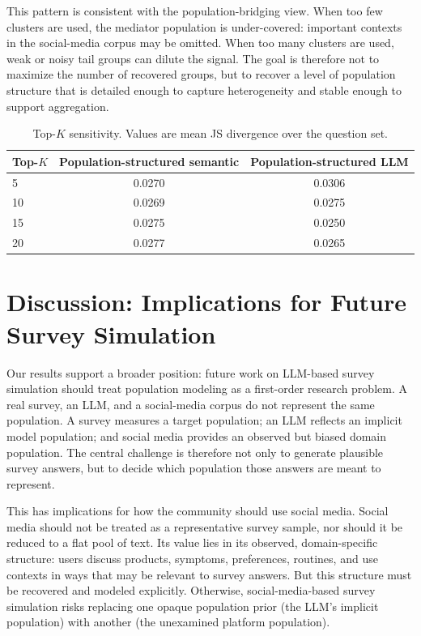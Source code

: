 \documentclass{article}
\begin{document}
This pattern is consistent with the population-bridging view.
When too few clusters are used, the mediator population is under-covered: important
contexts in the social-media corpus may be omitted.
When too many clusters are used, weak or noisy tail groups can dilute the signal.
The goal is therefore not to maximize the number of recovered groups, but to recover a
level of population structure that is detailed enough to capture heterogeneity and stable
enough to support aggregation.

\begin{table}[htb!]
\centering
\small
\begin{tabular}{lcc}
\toprule
Top-$K$ & Population-structured semantic & Population-structured LLM \\
\midrule
5  & 0.0270 & 0.0306 \\
10 & 0.0269 & 0.0275 \\
15 & 0.0275 & 0.0250 \\
20 & 0.0277 & 0.0265 \\
\bottomrule
\end{tabular}
\caption{Top-$K$ sensitivity. Values are mean JS divergence over the question set.}
\label{tab:topk}
\end{table}

\section{Discussion: Implications for Future Survey Simulation}
\label{sec:discussion}

Our results support a broader position: future work on LLM-based survey simulation should treat population modeling as a first-order research problem.
A real survey, an LLM, and a social-media corpus do not represent the same population.
A survey measures a target population; an LLM reflects an implicit model population; and social media provides an observed but biased domain population.
The central challenge is therefore not only to generate plausible survey answers, but to decide which population those answers are meant to represent.

This has implications for how the community should use social media.
Social media should not be treated as a representative survey sample, nor should it be reduced to a flat pool of text.
Its value lies in its observed, domain-specific structure: users discuss products, symptoms, preferences, routines, and use contexts in ways that may be relevant to survey answers.
But this structure must be recovered and modeled explicitly.
Otherwise, social-media-based survey simulation risks replacing one opaque population prior (the LLM's implicit population) with another (the unexamined platform population).
\end{document}
